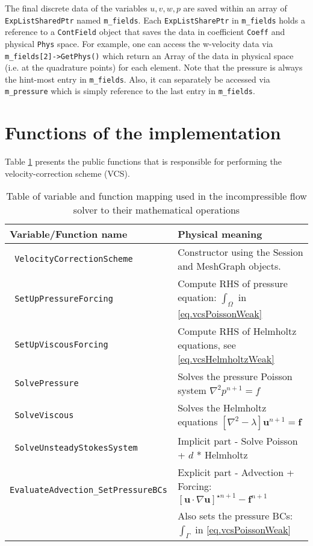 The final discrete data of the variables $u,v,w,p$ are saved within an array of
\verb|ExpListSharedPtr| named \verb|m_fields|.
Each \verb|ExpListSharePtr| in \verb|m_fields| holds a reference to a \verb|ContField| object
that saves the data in coefficient \verb|Coeff| and physical \verb|Phys| space.
For example, one can access the w-velocity data via \verb|m_fields[2]->GetPhys()|
which return an Array of the data in physical space (i.e. at the quadrature points)
for each element.
Note that the pressure is always the hint-most entry in \verb|m_fields|.
Also, it can separately be accessed via \verb|m_pressure| which is simply
reference to the last entry in \verb|m_fields|.


\section{Functions of the implementation}
Table \ref{tab:IncNSFunctionName} presents the public functions that is responsible for performing the velocity-correction scheme (VCS).
\begin{table}[htbp!]
    \caption {Table of variable and function mapping used in the incompressible flow solver to their mathematical operations}
    \label{tab:IncNSFunctionName} 
    \begin{center}
        \begin{tabular}{ | l | l|}
        \hline      
        \textbf{ Variable/Function name} & \textbf{ Physical meaning} \\  
        \hline
        \verb| VelocityCorrectionScheme|  & Constructor using the Session and MeshGraph objects.\\
        \hline
        \verb| SetUpPressureForcing| & Compute RHS of pressure equation: $\int_\Omega$ in \ref{eq.vcsPoissonWeak} \\
        \hline
        \verb| SetUpViscousForcing| &  Compute RHS of Helmholtz equations, see \ref{eq.vcsHelmholtzWeak} \\ 
        \hline
        \verb| SolvePressure| & Solves the pressure Poisson system $\nabla^2 p^{n+1} = f$ \\
        \hline
        \verb| SolveViscous| & Solves the Helmholtz equations $[\nabla^2 - \lambda] \mathbf{u}^{n+1} = \mathbf{f}$\\
        \hline
        \verb| SolveUnsteadyStokesSystem| & Implicit part - Solve Poisson + $d$ * Helmholtz\\
        \hline
        \verb| EvaluateAdvection_SetPressureBCs| & Explicit part - Advection + Forcing: $[\mathbf{u} \cdot \nabla \mathbf{u}]^{\star n+1} - \mathbf{f}^{n+1}$ \\
         & Also sets the pressure BCs: $\int_\Gamma$ in \ref{eq.vcsPoissonWeak} \\
        \hline
        \end{tabular}
    \end{center}
\end{table}





